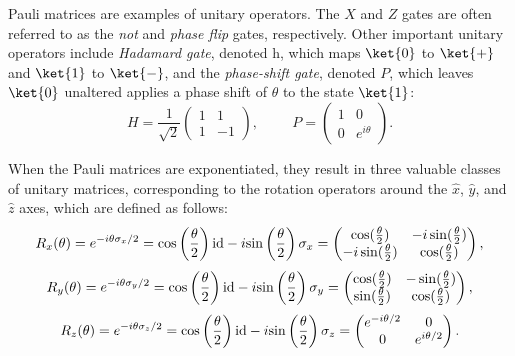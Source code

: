 \begin{example}
Pauli matrices are examples of unitary operators. The $X$ and $Z$ gates are often referred to as the \emph{not} and \emph{phase flip} gates, respectively. Other important unitary operators include   \emph{Hadamard gate}, denoted \gls{h}, which maps $\ket{0}$ to $\ket{+}$ and $\ket{1}$ to  $\ket{-}$, and the \emph{phase-shift gate}, denoted $P$, which leaves $\ket{0}$ unaltered applies a phase shift of $\theta$ to the state $\ket{1}$:
\begin{equation*}
 H = \frac{1}{\sqrt{2}}\begin{pmatrix} 1 & 1\\ 1 & -1 \end{pmatrix}, \hspace{1cm} P = \begin{pmatrix} 1 & 0\\ 0 & e^{i \theta} \end{pmatrix}.
\end{equation*}
 
When the Pauli matrices are exponentiated, they result in three valuable classes of unitary matrices, corresponding to the rotation operators around the $\hat{x}$, $\hat{y}$, and $\hat{z}$ axes, which are defined as follows:
\begin{equation*}
  R_{x}(\theta) = e^{-i\theta \sigma_{x}/2} = \text{cos} \left(\frac{\theta}{2} \right) \mathrm{id} -i \text{sin} \left(\frac{\theta}{2} \right) \sigma_{x} = \begin{pmatrix} \cos(\frac{\theta}{2}) & -i\sin(\frac{\theta}{2})\\ -i\sin(\frac{\theta}{2}) & \cos(\frac{\theta}{2}) \end{pmatrix},
\end{equation*}
\begin{equation*}
  R_{y}(\theta) = e^{-i\theta \sigma_{y}/2} = \text{cos} \left(\frac{\theta}{2} \right) \mathrm{id} -i \text{sin} \left(\frac{\theta}{2} \right) \sigma_{y} = \begin{pmatrix} \cos(\frac{\theta}{2}) & -\sin(\frac{\theta}{2})\\ \sin(\frac{\theta}{2}) & \cos(\frac{\theta}{2}) \end{pmatrix},
\end{equation*}
\begin{equation*}
  R_{z}(\theta) = e^{-i\theta \sigma_{z}/2} = \text{cos} \left(\frac{\theta}{2} \right) \mathrm{id} -i \text{sin} \left(\frac{\theta}{2} \right) \sigma_{z} = \begin{pmatrix} e^{-i\theta/2} & 0\\ 0 & e^{i\theta/2} \end{pmatrix}.
\end{equation*}
\end{example}

